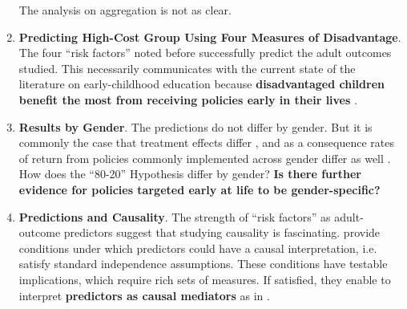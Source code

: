 \begin{enumerate}
\noindent The analysis on aggregation is not as clear.\\

\item \textbf{Predicting High-Cost Group Using Four Measures of Disadvantage}.\\
\noindent The four ``risk factors'' noted before successfully predict the adult outcomes studied. This necessarily communicates with the current state of the literature on early-childhood education because \textbf{disadvantaged children benefit the most from receiving policies early in their lives} \citep{Elango_Hojman_etal_2016_Early-Edu}.\\

\item \textbf{Results by Gender}.
\noindent The predictions do not differ by gender. But it is commonly the case that treatment effects differ \citep[see][]{Elango_Hojman_etal_2016_Early-Edu}, and as a consequence rates of return from policies commonly implemented across gender differ as well \citep[see][]{Garcia_etal_2016_Comp_CBA_Unpublished}. How does the  ``80-20'' Hypothesis differ by gender? \textbf{Is there further evidence for policies targeted early at life to be gender-specific?}\\

\item \textbf{Predictions and Causality}.
\noindent The strength of ``risk factors'' as adult-outcome predictors suggest that studying causality is fascinating. \citep[see][]{Garcia_etal_2016_Comp_CBA_Unpublished} provide conditions under which predictors could have a causal interpretation, i.e. satisfy standard independence assumptions. These conditions have testable implications, which require rich sets of measures. If satisfied, they enable to interpret \textbf{predictors as causal mediators} as in \citep{Heckman_Pinto_etal_2013_PerryFactor}.

\end{enumerate}


\pagebreak
\singlespace


